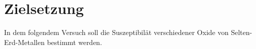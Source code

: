 \section{Zielsetzung}

\label{sec:Zielsetzung}
In dem folgendem Versuch soll die Suszeptibilät verschiedener Oxide von Selten-Erd-Metallen bestimmt werden.
